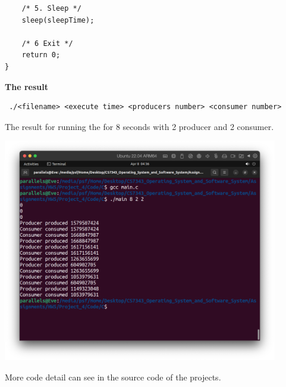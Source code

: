 \documentclass[12pt]{article}
\newenvironment{sol}[1][Solution]{\begin{trivlist}\item[\hskip\labelsep {\bfseries #1:}]}{\end{trivlist}}
\begin{document}
\begin{sol}
\begin{enumerate}
\begin{verbatim}
    /* 5. Sleep */
    sleep(sleepTime);

    /* 6 Exit */
    return 0;
}
\end{verbatim}

        \end{enumerate}
    \textbf{The result}
    \begin{verbatim}
 ./<filename> <execute time> <producers number> <consumer number>
    \end{verbatim}
    The result for running the for 8 seconds with 2 producer and 2 consumer.
    \begin{center}
        \includegraphics[width=0.9\textwidth]{3.png}
    \end{center}
    \end{sol}
    More code detail can see in the source code of the projects.
\end{document}
